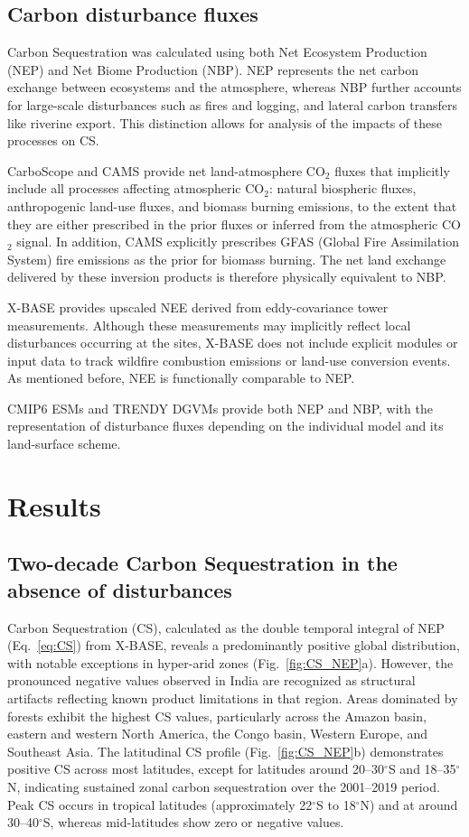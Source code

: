 \documentclass[ProofPDF]{./Styles/Jnls-Template-V3}
\begin{document}
\subsection{Carbon disturbance fluxes}

Carbon Sequestration was calculated using both Net Ecosystem Production (NEP) and Net Biome Production (NBP). NEP represents the net carbon exchange between ecosystems and the atmosphere, whereas NBP further accounts for large-scale disturbances such as fires and logging, and lateral carbon transfers like riverine export. This distinction allows for analysis of the impacts of these processes on CS. 

CarboScope and CAMS provide net land-atmosphere CO$_2$ fluxes that implicitly include all processes affecting atmospheric CO$_2$: natural biospheric fluxes, anthropogenic land-use fluxes, and biomass burning emissions, to the extent that they are either prescribed in the prior fluxes or inferred from the atmospheric CO$_2$ signal. In addition, CAMS explicitly prescribes GFAS (Global Fire Assimilation System) fire emissions as the prior for biomass burning. The net land exchange delivered by these inversion products is therefore physically equivalent to NBP.

X-BASE provides upscaled NEE derived from eddy-covariance tower measurements. Although these measurements may implicitly reflect local disturbances occurring at the sites, X-BASE does not include explicit modules or input data to track wildfire combustion emissions or land-use conversion events. As mentioned before, NEE is functionally comparable to NEP.

CMIP6 ESMs and TRENDY DGVMs provide both NEP and NBP, with the representation of disturbance fluxes depending on the individual model and its land-surface scheme.


\section{Results}

\subsection{Two-decade Carbon Sequestration in the absence of disturbances}
Carbon Sequestration (CS), calculated as the double temporal integral of NEP (Eq.~\ref{eq:CS}) from X-BASE, reveals a predominantly positive global distribution, with notable exceptions in hyper-arid zones (Fig.~\ref{fig:CS_NEP}a). However, the pronounced negative values observed in India are recognized as structural artifacts reflecting known product limitations in that region. Areas dominated by forests exhibit the highest CS values, particularly across the Amazon basin, eastern and western North America, the Congo basin, Western Europe, and Southeast Asia. The latitudinal CS profile (Fig.~\ref{fig:CS_NEP}b) demonstrates positive CS across most latitudes, except for latitudes around 20--30$^{\circ}$S and 18--35$^{\circ}$N, indicating sustained zonal carbon sequestration over the 2001--2019 period. Peak CS occurs in tropical latitudes (approximately 22$^{\circ}$S to 18$^{\circ}$N) and at around 30--40$^{\circ}$S, whereas mid-latitudes show zero or negative values.
\end{document}
